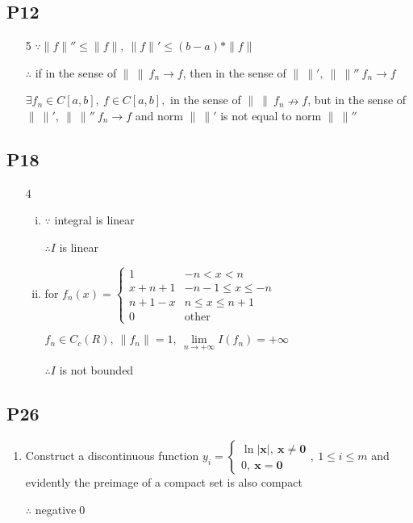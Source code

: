 \subsection{P12}
\begin{enumerate}[1]
    \item[5] $\because \|f\|''\leq\|f\|,\ \|f\|'\leq(b-a)*\|f\|$
    \par $\therefore $ if in the sense of $\|\ \|\ f_n \to f $, then in the sense of $\|\ \|',\ \|\ \|''\ f_n \to f $
    \par $ \exists f_n \in C[a,b],\ f\in C[a,b] ,$ in the sense of $\|\ \|\ f_n \nrightarrow f $, but in the sense of $\|\ \|',\ \|\ \|''\ f_n \to  f $ and norm $\|\ \|'$ is not equal to norm $\|\ \|''$

\end{enumerate}


\subsection{P18}
\begin{enumerate}[1]
    \item[4] 
    \begin{enumerate}[(i)]
        \item 
        $\because $ integral is linear
        \par $\therefore I$ is linear
        \item 
        \par for $f_n(x)=\begin{cases} 1&-n<x<n\\
            x+n+1&-n-1\leqslant x\leqslant -n\\
            n+1-x&n\leqslant x\leqslant n+1\\
            0&\mathrm{other} 
        \end{cases}$
        \par $f_n\in C_c(R),\ \|f_n\|=1,\ \lim \limits_{n \to + \infty} I(f_n) = +\infty $ 
        \par $ \therefore I $ is not bounded
    \end{enumerate} 
    
\end{enumerate}

\subsection{P26}
\begin{enumerate}[5]
    \item
    Construct a discontinuous function $y_i=
    \begin{cases} \ln|\boldsymbol{x}|,\ \boldsymbol{x}\neq \boldsymbol{0} \\ 0,\ \boldsymbol{x}=\boldsymbol{0}
        \end{cases}
    ,\ 1\leqslant i\leqslant m$ and evidently the preimage of a compact set is also compact 
    \par $\therefore$ negative\qed
\end{enumerate}

